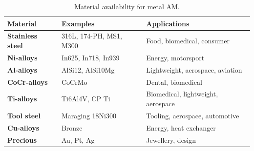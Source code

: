 \begin{table}[H]
\centering 
    \begin{tabular}{|l l l|}
    \hline
     \textbf{Material} & \textbf{Examples} & \textbf{Applications}\\
    \hline \hline
    \textbf{Stainless steel} & 316L, 174-PH, MS1, M300 & Food, biomedical, consumer \T\B\\
    \hline
    \textbf{Ni-alloys} & In625, In718, In939 & Energy, motorsport\T\B\\
    \hline
    
    \textbf{Al-alloys} & AlSi12, AlSi10Mg & Lightweight, aerospace, aviation\T\B\\
    \hline

    \textbf{CoCr-alloys} & CoCrMo & Dental, biomedical\T\B\\
    \hline

    \textbf{Ti-alloys} & Ti6Al4V, CP Ti & Biomedical, lightweight, aerospace\T\B\\
    \hline

    \textbf{Tool steel} & Maraging 18Ni300 & Tooling, aerospace, automotive\T\B\\
    \hline

    \textbf{Cu-alloys} & Bronze & Energy, heat exchanger\T\B\\
    \hline

    \textbf{Precious} & Au, Pt, Ag & Jewellery, design\T\B\\
    \hline
    
    \end{tabular}
    \\[10pt]
    \caption{Material availability for metal AM.}
    \label{table:materialAMmetal}
\end{table}




